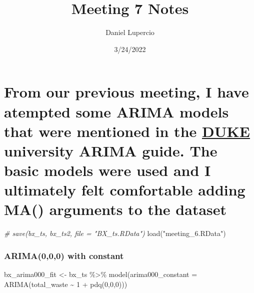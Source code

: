 \documentclass[
]{article}
\title{Meeting 7 Notes}
\author{Daniel Lupercio}
\date{3/24/2022}
\newenvironment{Shaded}{\begin{snugshade}}{\end{snugshade}}
\newcommand{\AttributeTok}[1]{\textcolor[rgb]{0.77,0.63,0.00}{#1}}
\newcommand{\CommentTok}[1]{\textcolor[rgb]{0.56,0.35,0.01}{\textit{#1}}}
\newcommand{\DecValTok}[1]{\textcolor[rgb]{0.00,0.00,0.81}{#1}}
\newcommand{\FunctionTok}[1]{\textcolor[rgb]{0.00,0.00,0.00}{#1}}
\newcommand{\NormalTok}[1]{#1}
\newcommand{\OtherTok}[1]{\textcolor[rgb]{0.56,0.35,0.01}{#1}}
\newcommand{\SpecialCharTok}[1]{\textcolor[rgb]{0.00,0.00,0.00}{#1}}
\newcommand{\StringTok}[1]{\textcolor[rgb]{0.31,0.60,0.02}{#1}}
\begin{document}
\maketitle

\hypertarget{from-our-previous-meeting-i-have-atempted-some-arima-models-that-were-mentioned-in-the-duke-university-arima-guide.-the-basic-models-were-used-and-i-ultimately-felt-comfortable-adding-ma-arguments-to-the-dataset}{%
\section{\texorpdfstring{From our previous meeting, I have atempted some
ARIMA models that were mentioned in the
\href{https://people.duke.edu/~rnau/411arim2.htm}{DUKE} university ARIMA
guide. The basic models were used and I ultimately felt comfortable
adding MA() arguments to the
dataset}{From our previous meeting, I have atempted some ARIMA models that were mentioned in the DUKE university ARIMA guide. The basic models were used and I ultimately felt comfortable adding MA() arguments to the dataset}}\label{from-our-previous-meeting-i-have-atempted-some-arima-models-that-were-mentioned-in-the-duke-university-arima-guide.-the-basic-models-were-used-and-i-ultimately-felt-comfortable-adding-ma-arguments-to-the-dataset}}

\begin{Shaded}
\begin{Highlighting}[]
\CommentTok{\# save(bx\_ts, bx\_ts2, file = "BX\_ts.RData")}
\FunctionTok{load}\NormalTok{(}\StringTok{"meeting\_6.RData"}\NormalTok{)}
\end{Highlighting}
\end{Shaded}

\hypertarget{arima000-with-constant}{%
\subsubsection{ARIMA(0,0,0) with
constant}\label{arima000-with-constant}}

\begin{Shaded}
\begin{Highlighting}[]
\NormalTok{bx\_arima000\_fit }\OtherTok{\textless{}{-}}\NormalTok{ bx\_ts }\SpecialCharTok{\%\textgreater{}\%} \FunctionTok{model}\NormalTok{(}\AttributeTok{arima000\_constant =} \FunctionTok{ARIMA}\NormalTok{(total\_waste }\SpecialCharTok{\textasciitilde{}} \DecValTok{1} \SpecialCharTok{+} \FunctionTok{pdq}\NormalTok{(}\DecValTok{0}\NormalTok{,}\DecValTok{0}\NormalTok{,}\DecValTok{0}\NormalTok{)))}
\end{Highlighting}
\end{Shaded}
\end{document}
